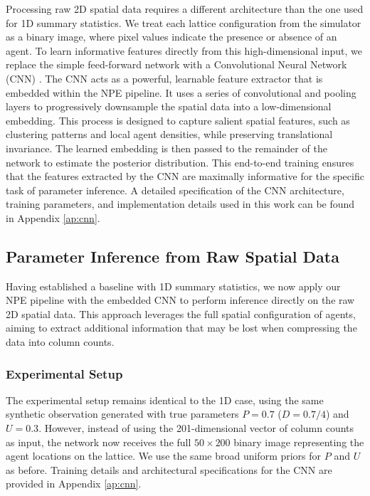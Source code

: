 \documentclass{article}
\begin{document}
Processing raw 2D spatial data requires a different architecture than the one used for 1D summary statistics. We treat each lattice configuration from the simulator as a binary image, where pixel values indicate the presence or absence of an agent. To learn informative features directly from this high-dimensional input, we replace the simple feed-forward network with a Convolutional Neural Network (CNN) \citep{lecun1998,krizhevsky2012,goodfellow2016}. The CNN acts as a powerful, learnable feature extractor that is embedded within the NPE pipeline. It uses a series of convolutional and pooling layers to progressively downsample the spatial data into a low-dimensional embedding. This process is designed to capture salient spatial features, such as clustering patterns and local agent densities, while preserving translational invariance. The learned embedding is then passed to the remainder of the network to estimate the posterior distribution. This end-to-end training ensures that the features extracted by the CNN are maximally informative for the specific task of parameter inference. A detailed specification of the CNN architecture, training parameters, and implementation details used in this work can be found in Appendix \ref{ap:cnn}.





\subsection{Parameter Inference from Raw Spatial Data}

Having established a baseline with 1D summary statistics, we now apply our NPE pipeline with the embedded CNN to perform inference directly on the raw 2D spatial data. This approach leverages the full spatial configuration of agents, aiming to extract additional information that may be lost when compressing the data into column counts.

\subsubsection{Experimental Setup}
The experimental setup remains identical to the 1D case, using the same synthetic observation generated with true parameters $P = 0.7$ ($D=0.7/4$) and $U = 0.3$. However, instead of using the 201-dimensional vector of column counts as input, the network now receives the full $50 \times 200$ binary image representing the agent locations on the lattice. We use the same broad uniform priors for $P$ and $U$ as before. Training details and architectural specifications for the CNN are provided in Appendix \ref{ap:cnn}.
\end{document}

